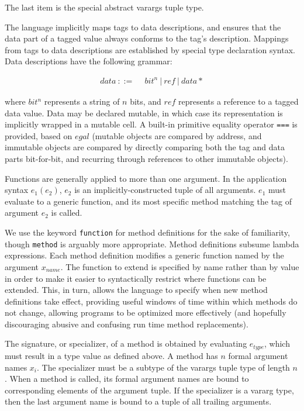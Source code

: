 \noindent
The last item is the special abstract varargs tuple type.

The language implicitly maps tags to data descriptions, and ensures that
the data part of a tagged value always conforms to the tag's description.
Mappings from tags to data descriptions are established by special type
declaration syntax. Data descriptions have the following grammar:

\vspace{-3ex}
\begin{singlespace}
\begin{align*}
data\ ::=\ &\ bit^n\ |\ ref\ |\ data*
\end{align*}
\end{singlespace}

\noindent
where $bit^n$ represents a string of $n$ bits, and $ref$ represents a reference
to a tagged data value. Data may be declared mutable, in which case its
representation is implicitly wrapped in a mutable cell. A built-in primitive
equality operator \texttt{===} is provided, based on $egal$ \cite{egal}
(mutable objects are compared by address, and immutable objects are compared
by directly comparing both the tag and data parts bit-for-bit, and recurring
through references to other immutable objects).

Functions are generally applied to more than one argument. In the application
syntax $e_1(e_2)$, $e_2$ is an implicitly-constructed tuple of all arguments.
$e_1$ must evaluate to a generic function, and its most specific method
matching the tag of argument $e_2$ is called.

We use the keyword \texttt{function} for method definitions for the sake of
familiarity, though \texttt{method} is arguably more appropriate. Method
definitions subsume lambda expressions. Each method definition modifies a
generic function named by the argument $x_{name}$. The function to extend is
specified by name rather than by value in order to make it easier to syntactically
restrict where functions can be extended. This, in turn, allows the language to
specify when new method definitions take effect, providing useful windows of
time within which methods do not change, allowing programs to be optimized more
effectively (and hopefully discouraging abusive and confusing run time
method replacements).

The signature, or specializer, of a method is obtained by evaluating $e_{type}$,
which must result in a type value as defined above. A method has $n$
formal argument names $x_i$. The specializer must be a subtype of the
varargs tuple type of length $n$. When a method is called, its formal argument
names are bound to corresponding elements of the argument tuple. If the
specializer is a vararg type, then the last argument name is bound to a
tuple of all trailing arguments.

